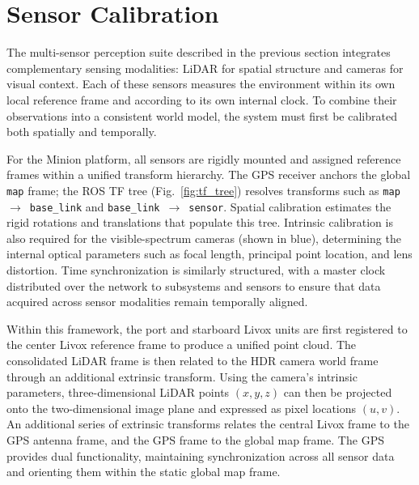 \documentclass[../main.tex]{subfiles}
\begin{document}
\section{Sensor Calibration} \label{sec:calibration}

The multi-sensor perception suite described in the previous section integrates complementary sensing modalities: \ac{LiDAR} for spatial structure and cameras for visual context.
Each of these sensors measures the environment within its own local reference frame and according to its own internal clock.
To combine their observations into a consistent world model, the system must first be calibrated both spatially and temporally.

For the Minion platform, all sensors are rigidly mounted and assigned reference frames within a unified transform hierarchy. 
The GPS receiver anchors the global \texttt{map} frame; the ROS TF tree (Fig.~\ref{fig:tf_tree}) resolves transforms such as \texttt{map}\ $\rightarrow$\ \texttt{base\_link} and \texttt{base\_link}\ $\rightarrow$\ \texttt{sensor}. Spatial calibration estimates the rigid rotations and translations that populate this tree.  
Intrinsic calibration is also required for the visible-spectrum cameras (shown in blue), determining the internal optical parameters such as focal length, principal point location, and lens distortion. 
Time synchronization is similarly structured, with a master clock distributed over the network to subsystems and sensors to ensure that data acquired across sensor modalities remain temporally aligned.

Within this framework, the port and starboard Livox units are first registered to the center Livox reference frame to produce a unified point cloud. 
The consolidated LiDAR frame is then related to the HDR camera world frame through an additional extrinsic transform. 
Using the camera’s intrinsic parameters, three-dimensional LiDAR points $(x, y, z)$ can then be projected onto the two-dimensional image plane and expressed as pixel locations $(u, v)$. 
An additional series of extrinsic transforms relates the central Livox frame to the \ac{GPS} antenna frame, and the \ac{GPS} frame to the global map frame. 
The \ac{GPS} provides dual functionality, maintaining synchronization across all sensor data and orienting them within the static global map frame.
\end{document}
